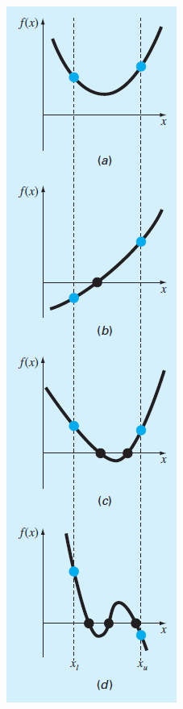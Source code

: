 \documentclass[../main.tex]{subfiles}
\begin{document}
\begin{figure}[hbt!]
    \centering
    \begin{minipage}[b]{.48\textwidth}
        \centering
        \includegraphics[width=.65\linewidth]{./images/fig_5_1}

\end{minipage}
\end{figure}
\end{document}
